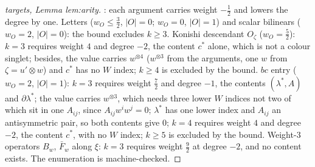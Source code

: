\begin{proof}
[targets, Lemma lem:arity]: each argument carries weight $-\tfrac12$ and lowers the degree by one. Letters ($w_O\le\tfrac32$, $|O|=0$; $w_O=0$, $|O|=1$) and scalar bilinears ($w_O=2$, $|O|=0$): the bound excludes $k\ge3$. Konishi descendant $O_\zeta$ ($w_O=\tfrac52$): $k=3$ requires weight $4$ and degree $-2$, the content $c^*$ alone, which is not a colour singlet; besides, the value carries $w^{\otimes4}$ ($w^{\otimes3}$ from the arguments, one $w$ from $\zeta=u'\otimes w$) and $c^*$ has no $W$ index; $k\ge4$ is excluded by the bound. $bc$ entry ($w_O=2$, $|O|=1$): $k=3$ requires weight $\tfrac72$ and degree $-1$, the contents $(\lambda^*,A)$ and $\partial\lambda^*$; the value carries $w^{\otimes3}$, which needs three lower $W$ indices not two of which sit in one $A_{ij}$, since $A_{ij}w^iw^j=0$; $\lambda^*$ has one lower index and $A_{ij}$ an antisymmetric pair, so both contents give $0$; $k=4$ requires weight $4$ and degree $-2$, the content $c^*$, with no $W$ index; $k\ge5$ is excluded by the bound. Weight-$3$ operators $B_w$, $\bar F_w$ along $\xi$: $k=3$ requires weight $\tfrac92$ at degree $-2$, and no content exists. The enumeration is machine-checked.
\end{proof}

